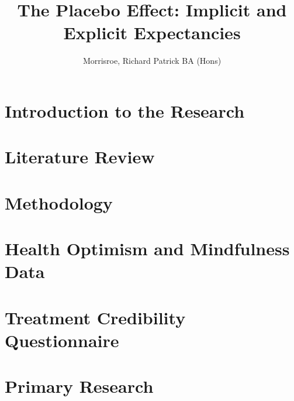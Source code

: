 \documentclass[apsych, phd]{uccthesis}
\title{The Placebo Effect: Implicit and Explicit Expectancies}
\author{Morrisroe, Richard Patrick BA (Hons)}
\begin{document}
\maketitle



\tableofcontents

\chapter{Introduction to the Research}
\label{cha:intr-rese}


\chapter{Literature Review}
\label{cha:literature-review}


% 

\chapter{Methodology}
\label{cha:methodology}


\chapter{Health Optimism and Mindfulness Data}
\label{cha:preliminary-research}

\chapter{Treatment Credibility Questionnaire}

\chapter{Primary Research}
\label{cha:primary-research}
\label{cha:primary-research-1}





\end{document}
